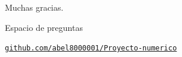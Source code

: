 \documentclass[10pt,aspectratio=169]{beamer}
\begin{document}
\begin{frame}[standout]
Muchas gracias.

\small Espacio de preguntas

\vspace{1em}
\small\normalfont
\href{https://github.com/abel8000001/Proyecto-numerico}{\texttt{github.com/abel8000001/Proyecto-numerico}}
\end{frame}
\end{document}
